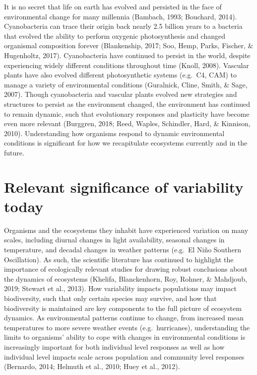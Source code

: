 \documentclass[12pt,twoside]{reedthesis}
\begin{document}
It is no secret that life on earth has evolved and persisted in the face of environmental change for many millennia (Bambach, 1993; Bouchard, 2014). Cyanobacteria can trace their origin back nearly 2.5 billion years to a bacteria that evolved the ability to perform oxygenic photosynthesis and changed organismal composition forever (Blankenship, 2017; Soo, Hemp, Parks, Fischer, \& Hugenholtz, 2017). Cyanobacteria have continued to persist in the world, despite experiencing widely different conditions throughout time (Knoll, 2008). Vascular plants have also evolved different photosynthetic systems (e.g.~C4, CAM) to manage a variety of environmental conditions (Guralnick, Cline, Smith, \& Sage, 2007). Though cyanobacteria and vascular plants evolved new strategies and structures to persist as the environment changed, the environment has continued to remain dynamic, such that evolutionary responses and plasticity have become even more relevant (Burggren, 2018; Reed, Waples, Schindler, Hard, \& Kinnison, 2010). Understanding how organisms respond to dynamic environmental conditions is significant for how we recapitulate ecosystems currently and in the future.

\hypertarget{relevant-significance-of-variability-today}{%
\section{Relevant significance of variability today}\label{relevant-significance-of-variability-today}}

Organisms and the ecosystems they inhabit have experienced variation on many scales, including diurnal changes in light availability, seasonal changes in temperature, and decadal changes in weather patterns (e.g.~El Niño Southern Oscillation). As such, the scientific literature has continued to highlight the importance of ecologically relevant studies for drawing robust conclusions about the dynamics of ecosystems (Khelifa, Blanckenhorn, Roy, Rohner, \& Mahdjoub, 2019; Stewart et al., 2013). How variability impacts populations may impact biodiversity, such that only certain species may survive, and how that biodiversity is maintained are key components to the full picture of ecosystem dynamics. As environmental patterns continue to change, from increased mean temperatures to more severe weather events (e.g.~hurricanes), understanding the limits to organisms' ability to cope with changes in environmental conditions is increasingly important for both individual level responses as well as how individual level impacts scale across population and community level responses (Bernardo, 2014; Helmuth et al., 2010; Huey et al., 2012).
\end{document}
